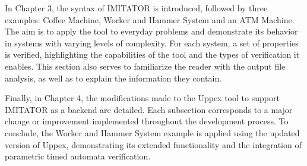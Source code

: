 In Chapter 3, the syntax of IMITATOR is introduced, followed by three examples: Coffee Machine, Worker and Hammer System and an ATM Machine. The aim is to apply the tool to everyday problems and demonstrate its behavior in systems with varying levels of complexity. For each system, a set of properties is verified, highlighting the capabilities of the tool and the types of verification it enables. This section also serves to familiarize the reader with the output file analysis, as well as to explain the information they contain.

Finally, in Chapter 4, the modifications made to the Uppex tool to support IMITATOR as a backend are detailed. Each subsection corresponds to a major change or improvement implemented throughout the development process. To conclude, the Worker and Hammer System example is applied using the updated version of Uppex, demonstrating its extended functionality and the integration of parametric timed automata verification.
